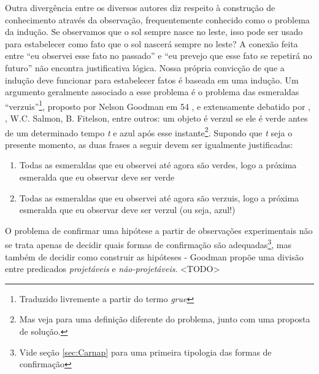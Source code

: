 Outra divergência entre os diversos autores diz respeito à construção de conhecimento através da observação,
frequentemente conhecido como o problema da indução.
Se observamos que o sol sempre nasce no leste,
isso pode ser usado para estabelecer como fato que o sol nascerá sempre no leste? A conexão feita entre ``eu observei esse
fato no passado'' e ``eu prevejo que esse fato se repetirá no futuro'' não encontra justificativa lógica. Nossa própria convicção
de que a indução deve funcionar para estabelecer fatos é baseada em uma indução. 
Um argumento geralmente associado a esse problema é o problema das esmeraldas ``verzuis''\footnote{Traduzido 
livremente a partir do termo {\em grue}}, proposto por Nelson Goodman em 54 \cite{Goodman83}, 
e extensamente debatido por 
\cite{Hacking65}, \cite{Kyburg74}, W.C. Salmon, B. Fitelson, entre outros: um objeto é verzul se ele
é verde antes de um determinado tempo {\em t} e azul após esse instante\footnote{Mas veja \citep{Quine70}
para uma definição diferente do problema, junto com uma proposta de solução.}. Supondo que {\em t} seja
o presente momento, as duas frases a seguir devem ser igualmente justificadas:
\begin{enumerate}
	\item Todas as esmeraldas que eu observei até agora são verdes, logo a próxima esmeralda que eu observar
		deve ser verde
	\item Todas as esmeraldas que eu observei até agora são verzuis, logo a próxima esmeralda que eu observar
		deve ser verzul (ou seja, azul!)
\end{enumerate}

O problema de confirmar uma hipótese a partir de observações experimentais não se trata apenas de decidir
quais formas de confirmação são adequadas\footnote{Vide seção \ref{sec:Carnap} para uma primeira tipologia
das formas de confirmação}, mas também de decidir como construir as hipóteses - Goodman propõe uma divisão
entre predicados {\em projetáveis} e {\em não-projetáveis}. <TODO>

